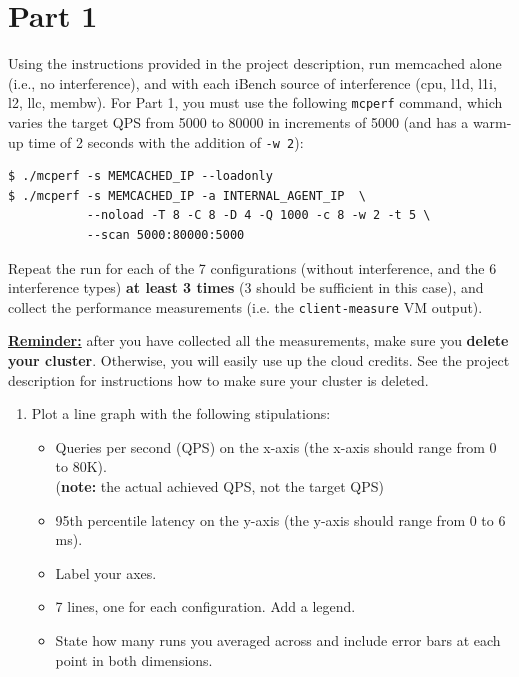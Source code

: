 \section*{Part 1}

Using the instructions provided in the project description, run memcached alone (i.e., no interference), and with each iBench source of interference (cpu, l1d, l1i, l2, llc, membw). For Part 1, you must use the following \texttt{mcperf} command, which varies the target QPS from 5000 to 80000 in increments of 5000 (and has a warm-up time of 2 seconds with the addition of \texttt{-w 2}):

\begin{verbatim}
$ ./mcperf -s MEMCACHED_IP --loadonly
$ ./mcperf -s MEMCACHED_IP -a INTERNAL_AGENT_IP  \
           --noload -T 8 -C 8 -D 4 -Q 1000 -c 8 -w 2 -t 5 \ 
           --scan 5000:80000:5000
\end{verbatim}

\noindent Repeat the run for each of the 7 configurations (without interference, and the 6 interference types) {\color{red} \textbf{at least 3 times}} (3 should be sufficient in this case), and collect the performance measurements (i.e. the \texttt{client-measure} VM output).

\noindent\textbf{\underline{Reminder:}} after you have collected all the measurements, make sure you \textbf{{\color{red}delete your cluster}}. Otherwise, you will easily use up the cloud credits. See the project description for instructions how to make sure your cluster is deleted.


\begin{enumerate}[label=(\alph*)]
    \setcounter{enumi}{0}

    \item Plot a line graph with the following stipulations:
    \begin{itemize}
        \item Queries per second (QPS) on the x-axis (the x-axis should range from 0 to 80K).\\
        (\textbf{note:} the actual achieved QPS, not the target QPS)
        \item 95th percentile latency on the y-axis (the y-axis should range from 0 to 6 ms).%
        \item Label your axes.
        \item 7 lines, one for each configuration. Add a legend.
        \item State how many runs you averaged across and include error bars at each point in both dimensions.
    \end{itemize}
    
    
\end{enumerate}

